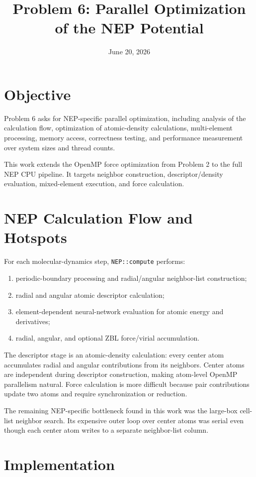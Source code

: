\documentclass[11pt]{article}
\title{Problem 6: Parallel Optimization of the NEP Potential}
\author{}
\date{June 20, 2026}
\begin{document}
\maketitle

\section{Objective}
Problem 6 asks for NEP-specific parallel optimization, including analysis of
the calculation flow, optimization of atomic-density calculations,
multi-element processing, memory access, correctness testing, and performance
measurement over system sizes and thread counts.

This work extends the OpenMP force optimization from Problem 2 to the full NEP
CPU pipeline. It targets neighbor construction, descriptor/density evaluation,
mixed-element execution, and force calculation.

\section{NEP Calculation Flow and Hotspots}
For each molecular-dynamics step, \texttt{NEP::compute} performs:
\begin{enumerate}
  \item periodic-boundary processing and radial/angular neighbor-list construction;
  \item radial and angular atomic descriptor calculation;
  \item element-dependent neural-network evaluation for atomic energy and derivatives;
  \item radial, angular, and optional ZBL force/virial accumulation.
\end{enumerate}

The descriptor stage is an atomic-density calculation: every center atom
accumulates radial and angular contributions from its neighbors. Center atoms
are independent during descriptor construction, making atom-level OpenMP
parallelism natural. Force calculation is more difficult because pair
contributions update two atoms and require synchronization or reduction.

The remaining NEP-specific bottleneck found in this work was the large-box
cell-list neighbor search. Its expensive outer loop over center atoms was
serial even though each center atom writes to a separate neighbor-list column.

\section{Implementation}
\end{document}
